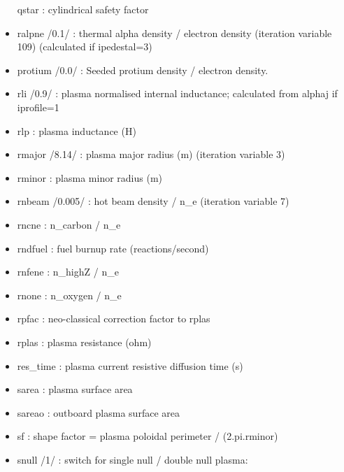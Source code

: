 \documentclass[]{article}
\begin{document}
\begin{itemize}
  qstar : cylindrical safety factor
\item
  ralpne /0.1/ : thermal alpha density / electron density (iteration
  variable 109) (calculated if ipedestal=3)
\item
  protium /0.0/ : Seeded protium density / electron density.
\item
  rli /0.9/ : plasma normalised internal inductance; calculated from
  alphaj if iprofile=1
\item
  rlp : plasma inductance (H)
\item
  rmajor /8.14/ : plasma major radius (m) (iteration variable 3)
\item
  rminor : plasma minor radius (m)
\item
  rnbeam /0.005/ : hot beam density / n\_e (iteration variable 7)
\item
  rncne : n\_carbon / n\_e
\item
  rndfuel : fuel burnup rate (reactions/second)
\item
  rnfene : n\_highZ / n\_e
\item
  rnone : n\_oxygen / n\_e
\item
  rpfac : neo-classical correction factor to rplas
\item
  rplas : plasma resistance (ohm)
\item
  res\_time : plasma current resistive diffusion time (s)
\item
  sarea : plasma surface area
\item
  sareao : outboard plasma surface area
\item
  sf : shape factor = plasma poloidal perimeter / (2.pi.rminor)
\item
  snull /1/ : switch for single null / double null plasma:


\end{itemize}
\end{document}
